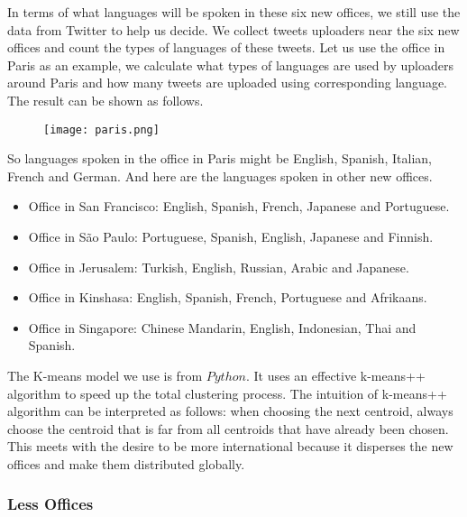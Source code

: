\documentclass{mcmthesis}
\begin{document}
  \indent In terms of what languages will be spoken in these six new offices, we still use the data from Twitter to help us decide. We collect tweets uploaders near the six new offices and count the types of languages of these tweets. Let us use the office in Paris as an example, we calculate what types of languages are used by uploaders around Paris and how many tweets are uploaded using corresponding language. The result can be shown as follows.

  \begin{figure}[h]
    \small
    \centering
    \texttt{[image: paris.png]}
  \end{figure}

  \indent So languages spoken in the office in Paris might be English, Spanish, Italian, French and German. And here are the languages spoken in other new offices.
  \begin{itemize}
    \item Office in San Francisco: English, Spanish, French, Japanese and Portuguese.
    \item Office in São Paulo: Portuguese, Spanish, English, Japanese and Finnish.
    \item Office in Jerusalem: Turkish, English, Russian, Arabic and Japanese.
    \item Office in Kinshasa: English, Spanish, French, Portuguese and Afrikaans.
    \item Office in Singapore: Chinese Mandarin, English, Indonesian, Thai and Spanish.
  \end{itemize} 

  \indent The K-means model we use is from $Python$. It uses an effective k-means++ algorithm to speed up the total clustering process. The intuition of k-means++ algorithm can be interpreted as follows: when choosing the next centroid, always choose the centroid that is far from all centroids that have already been chosen. This meets with the desire to be more international because it disperses the new offices and make them distributed globally. 

  \subsubsection{Less Offices}
\end{document}
